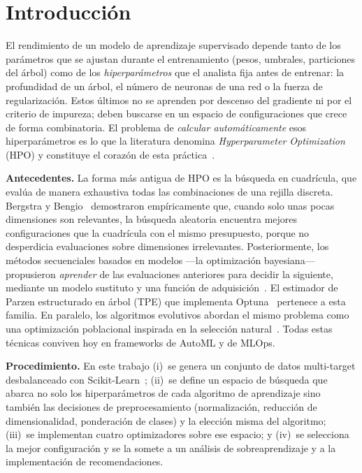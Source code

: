 \documentclass[11pt,a4paper,twocolumn]{article}
\begin{document}
\section{Introducción}
El rendimiento de un modelo de aprendizaje supervisado depende tanto de los parámetros que se ajustan
durante el entrenamiento (pesos, umbrales, particiones del árbol) como de los \emph{hiperparámetros} que el
analista fija antes de entrenar: la profundidad de un árbol, el número de neuronas de una red o la fuerza
de regularización. Estos últimos no se aprenden por descenso del gradiente ni por el criterio de impureza;
deben buscarse en un espacio de configuraciones que crece de forma combinatoria. El problema de
\emph{calcular automáticamente} esos hiperparámetros es lo que la literatura denomina \textit{Hyperparameter
Optimization} (HPO) y constituye el corazón de esta práctica~\cite{feurer2019,bergstra2012}.

\textbf{Antecedentes.} La forma más antigua de HPO es la búsqueda en cuadrícula, que evalúa de manera
exhaustiva todas las combinaciones de una rejilla discreta. Bergstra y Bengio~\cite{bergstra2012}
demostraron empíricamente que, cuando solo unas pocas dimensiones son relevantes, la búsqueda aleatoria
encuentra mejores configuraciones que la cuadrícula con el mismo presupuesto, porque no desperdicia
evaluaciones sobre dimensiones irrelevantes. Posteriormente, los métodos secuenciales basados en modelos
---la optimización bayesiana--- propusieron \emph{aprender} de las evaluaciones anteriores para decidir la
siguiente, mediante un modelo sustituto y una función de adquisición~\cite{shahriari2016}. El estimador de
Parzen estructurado en árbol (TPE) que implementa Optuna~\cite{akiba2019} pertenece a esta familia. En
paralelo, los algoritmos evolutivos abordan el mismo problema como una optimización poblacional inspirada en
la selección natural~\cite{goldberg1989}. Todas estas técnicas conviven hoy en frameworks de AutoML y de
MLOps.

\textbf{Procedimiento.} En este trabajo (i)~se genera un conjunto de datos multi-target desbalanceado con
Scikit-Learn~\cite{geron2019}; (ii)~se define un espacio de búsqueda que abarca no solo los hiperparámetros
de cada algoritmo de aprendizaje sino también las decisiones de preprocesamiento (normalización, reducción
de dimensionalidad, ponderación de clases) y la elección misma del algoritmo; (iii)~se implementan cuatro
optimizadores sobre ese espacio; y (iv)~se selecciona la mejor configuración y se la somete a un análisis de
sobreaprendizaje y a la implementación de recomendaciones.
\end{document}
